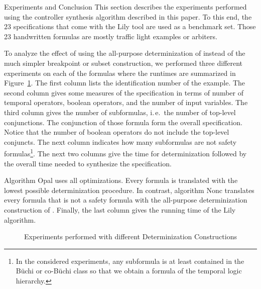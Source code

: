 \documentclass[copyright,creativecommons]{eptcs}
\newcommand{\ie}{i.\,e.~}
\begin{document}
\begin{section}{Experiments and Conclusion}
\label{ExperimentalResults}
This section describes the experiments performed using the controller synthesis algorithm described in this paper. To this end, the $23$ specifications that come with the Lily tool \cite{JoBl06} are used as a benchmark set. Those 23 handwritten formulas are mostly traffic light examples or arbiters.

To analyze the effect of using the all-purpose determinization of \cite{MoSc08} instead of the much simpler breakpoint or subset construction, we performed three different experiments on each of the formulas where the runtimes are summarized in Figure~\ref{table:det_table}. The first column lists the identification number of the example. The second column gives some measures of the specification in terms of number of temporal operators, boolean operators, and the number of input variables. The third column gives the number of subformulas, \ie the number of top-level conjunctions. The conjunction of those formula form the overall specification. Notice that the number of boolean operators do not include the top-level conjuncts. The next column indicates how many subformulas are not safety formulas\footnote{In the considered experiments, any subformula is at least contained in the Büchi or co-Büchi class so that we obtain a formula of the temporal logic hierarchy.}. The next two columns give the time for determinization followed by the overall time needed to synthesize the specification.

Algorithm Opal uses all optimizations. Every formula is translated with the lowest possible determinization procedure. In contrast, algorithm Nonc translates every formula that is not a safety formula with the all-purpose determinization construction of \cite{MoSc08}. Finally, the last column gives the running time of the Lily algorithm.

\begin{figure}
\centering
{}
\endpgfgraphicnamed
\caption{Experiments performed with different Determinization Constructions}
\label{table:det_table}
\end{figure}


\end{section}
\end{document}

